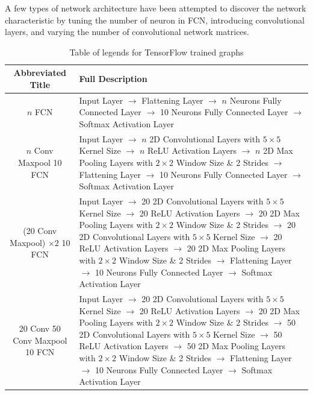 A few types of network architecture have been attempted to discover the network characteristic by tuning the number of neuron in FCN, introducing convolutional layers, and varying the number of convolutional network matrices.
\begin{table}[ht]
	\centering
	\begin{tabular}[t]{cL{11cm}}
		\hline
		Abbreviated Title & Full Description\\
		\hline
		\hline
		$n$ FCN & Input Layer $\rightarrow$ Flattening Layer $\rightarrow$ $n$ Neurons Fully Connected Layer $\rightarrow$ 10 Neurons Fully Connected Layer $\rightarrow$ Softmax Activation Layer\\
		$n$ Conv Maxpool 10 FCN & Input Layer $\rightarrow$ $n$ 2D Convolutional Layers with $5\times 5$ Kernel Size $\rightarrow$ $n$ ReLU Activation Layers $\rightarrow$ $n$ 2D Max Pooling Layers with $2\times2$ Window Size \& 2 Strides $\rightarrow$ Flattening Layer $\rightarrow$ 10 Neurons Fully Connected Layer $\rightarrow$ Softmax Activation Layer\\
		(20 Conv Maxpool) $\times 2$ 10 FCN &  Input Layer $\rightarrow$ 20 2D Convolutional Layers with $5\times 5$ Kernel Size $\rightarrow$ 20 ReLU Activation Layers $\rightarrow$ 20 2D Max Pooling Layers with $2\times2$ Window Size \& 2 Strides $\rightarrow$ 20 2D Convolutional Layers with $5\times 5$ Kernel Size $\rightarrow$ 20 ReLU Activation Layers $\rightarrow$ 20 2D Max Pooling Layers with $2\times2$ Window Size \& 2 Strides $\rightarrow$ Flattening Layer $\rightarrow$ 10 Neurons Fully Connected Layer $\rightarrow$ Softmax Activation Layer\\
		20 Conv 50 Conv Maxpool 10 FCN & Input Layer $\rightarrow$ 20 2D Convolutional Layers with $5\times 5$ Kernel Size $\rightarrow$ 20 ReLU Activation Layers $\rightarrow$ 20 2D Max Pooling Layers with $2\times2$ Window Size \& 2 Strides $\rightarrow$ 50 2D Convolutional Layers with $5\times 5$ Kernel Size $\rightarrow$ 50 ReLU Activation Layers $\rightarrow$ 50 2D Max Pooling Layers with $2\times2$ Window Size \& 2 Strides $\rightarrow$ Flattening Layer $\rightarrow$ 10 Neurons Fully Connected Layer $\rightarrow$ Softmax Activation Layer\\
		\hline
	\end{tabular}
	\caption{Table of legends for TensorFlow trained graphs}
\end{table}


